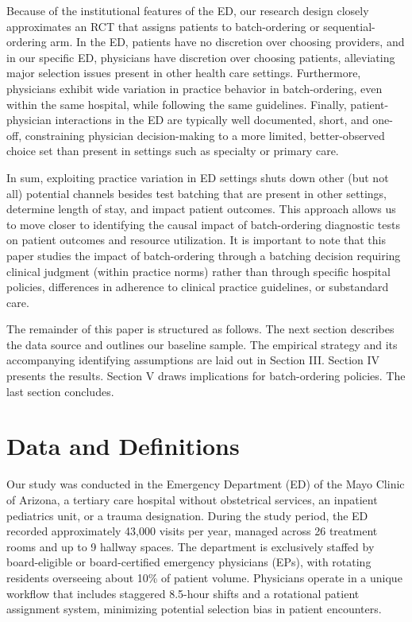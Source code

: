 \documentclass[,,nonblindrev]{informs}
\begin{document}
Because of the institutional features of the ED, our research design
closely approximates an RCT that assigns patients to batch-ordering or
sequential-ordering arm. In the ED, patients have no discretion over
choosing providers, and in our specific ED, physicians have discretion
over choosing patients, alleviating major selection issues present in
other health care settings. Furthermore, physicians exhibit wide
variation in practice behavior in batch-ordering, even within the same
hospital, while following the same guidelines. Finally,
patient-physician interactions in the ED are typically well documented,
short, and one-off, constraining physician decision-making to a more
limited, better-observed choice set than present in settings such as
specialty or primary care.

In sum, exploiting practice variation in ED settings shuts down other
(but not all) potential channels besides test batching that are present
in other settings, determine length of stay, and impact patient
outcomes. This approach allows us to move closer to identifying the
causal impact of batch-ordering diagnostic tests on patient outcomes and
resource utilization. It is important to note that this paper studies
the impact of batch-ordering through a batching decision requiring
clinical judgment (within practice norms) rather than through specific
hospital policies, differences in adherence to clinical practice
guidelines, or substandard care.

The remainder of this paper is structured as follows. The next section
describes the data source and outlines our baseline sample. The
empirical strategy and its accompanying identifying assumptions are laid
out in Section III. Section IV presents the results. Section V draws
implications for batch-ordering policies. The last section concludes.

\hypertarget{sec:II}{%
\section{Data and Definitions}\label{sec:II}}

Our study was conducted in the Emergency Department (ED) of the Mayo
Clinic of Arizona, a tertiary care hospital without obstetrical
services, an inpatient pediatrics unit, or a trauma designation. During
the study period, the ED recorded approximately 43,000 visits per year,
managed across 26 treatment rooms and up to 9 hallway spaces. The
department is exclusively staffed by board-eligible or board-certified
emergency physicians (EPs), with rotating residents overseeing about
10\% of patient volume. Physicians operate in a unique workflow that
includes staggered 8.5-hour shifts and a rotational patient assignment
system, minimizing potential selection bias in patient encounters.
\end{document}
